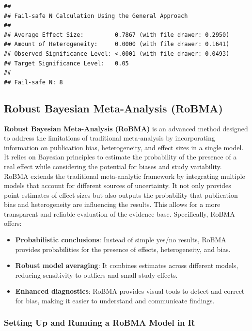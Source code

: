 \documentclass[
]{book}
\begin{document}
\begin{verbatim}
## 
## Fail-safe N Calculation Using the General Approach
## 
## Average Effect Size:         0.7867 (with file drawer: 0.2950)
## Amount of Heterogeneity:     0.0000 (with file drawer: 0.1641)
## Observed Significance Level: <.0001 (with file drawer: 0.0493)
## Target Significance Level:   0.05
## 
## Fail-safe N: 8
\end{verbatim}

\subsection{Robust Bayesian Meta-Analysis (RoBMA)}\label{robust-bayesian-meta-analysis-robma}

\textbf{Robust Bayesian Meta-Analysis (RoBMA)} is an advanced method designed to address the limitations of traditional meta-analysis by incorporating information on publication bias, heterogeneity, and effect sizes in a single model. It relies on Bayesian principles to estimate the probability of the presence of a real effect while considering the potential for biases and study variability. RoBMA extends the traditional meta-analytic framework by integrating multiple models that account for different sources of uncertainty. It not only provides point estimates of effect sizes but also outputs the probability that publication bias and heterogeneity are influencing the results. This allows for a more transparent and reliable evaluation of the evidence base. Specifically, RoBMA offers:

\begin{itemize}
\item
  \textbf{Probabilistic conclusions}: Instead of simple yes/no results, RoBMA provides probabilities for the presence of effects, heterogeneity, and bias.
\item
  \textbf{Robust model averaging}: It combines estimates across different models, reducing sensitivity to outliers and small study effects.
\item
  \textbf{Enhanced diagnostics}: RoBMA provides visual tools to detect and correct for bias, making it easier to understand and communicate findings.
\end{itemize}

\subsubsection{Setting Up and Running a RoBMA Model in R}\label{setting-up-and-running-a-robma-model-in-r}
\end{document}
